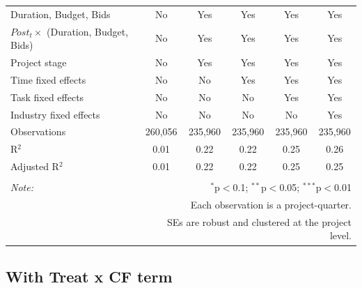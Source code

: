 \documentclass[
]{article}
\begin{document}
\begin{table}[H]
\begin{tabular}{@{\extracolsep{-2pt}}lccccc}
Duration, Budget, Bids & No & Yes & Yes & Yes & Yes \\ 
$Post_t \times $  (Duration, Budget, Bids) & No & Yes & Yes & Yes & Yes \\ 
Project stage & No & Yes & Yes & Yes & Yes \\ 
Time fixed effects & No & No & Yes & Yes & Yes \\ 
Task fixed effects & No & No & No & Yes & Yes \\ 
Industry fixed effects & No & No & No & No & Yes \\ 
Observations & 260,056 & 235,960 & 235,960 & 235,960 & 235,960 \\ 
R$^{2}$ & 0.01 & 0.22 & 0.22 & 0.25 & 0.26 \\ 
Adjusted R$^{2}$ & 0.01 & 0.22 & 0.22 & 0.25 & 0.25 \\ 
\hline 
\hline \\[-1.8ex] 
\textit{Note:}  & \multicolumn{5}{r}{$^{*}$p$<$0.1; $^{**}$p$<$0.05; $^{***}$p$<$0.01} \\ 
 & \multicolumn{5}{r}{Each observation is a project-quarter.} \\ 
 & \multicolumn{5}{r}{SEs are robust and clustered at the project level.} \\ 
\end{tabular} 
\end{table}

\hypertarget{with-treat-x-cf-term}{%
\subsection{With Treat x CF term}\label{with-treat-x-cf-term}}
\end{document}
